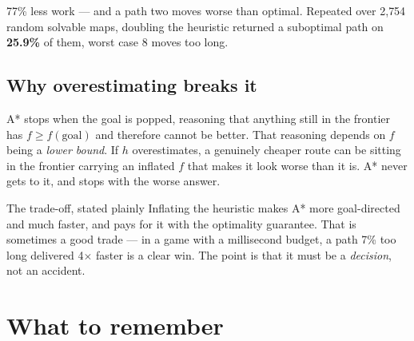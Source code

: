 \documentclass[11pt,a4paper]{article}
\begin{document}
77\% less work --- and a path two moves worse than optimal. Repeated over 2{,}754
random solvable maps, doubling the heuristic returned a suboptimal path on
\textbf{25.9\%} of them, worst case 8 moves too long.

\subsection{Why overestimating breaks it}

A* stops when the goal is popped, reasoning that anything still in the frontier
has $f \geq f(\text{goal})$ and therefore cannot be better. That reasoning depends
on $f$ being a \emph{lower bound}. If $h$ overestimates, a genuinely cheaper route
can be sitting in the frontier carrying an inflated $f$ that makes it look worse
than it is. A* never gets to it, and stops with the worse answer.

\begin{keyidea}{The trade-off, stated plainly}
Inflating the heuristic makes A* more goal-directed and much faster, and pays for
it with the optimality guarantee. That is sometimes a good trade --- in a game
with a millisecond budget, a path 7\% too long delivered 4$\times$ faster is a
clear win. The point is that it must be a \emph{decision}, not an accident.
\end{keyidea}

\section{What to remember}
\end{document}
